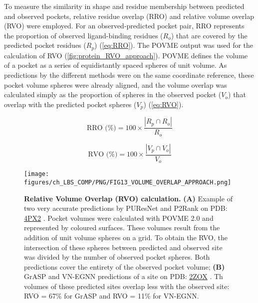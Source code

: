 To measure the similarity in shape and residue membership between predicted and observed pockets, relative residue overlap (RRO) and relative volume overlap (RVO) were employed. For an observed-predicted pocket pair, RRO represents the proportion of observed ligand-binding residues ($R_{o}$) that are covered by the predicted pocket residues ($R_{p}$) (\autoref{eq:RRO}). The POVME output was used for the calculation of RVO (\autoref{fig:protein_RVO_approach}). POVME defines the volume of a pocket as a series of equidistantly spaced spheres of unit volume. As predictions by the different methods were on the same coordinate reference, these pocket volume spheres were already aligned, and the volume overlap was calculated simply as the proportion of spheres in the observed pocket ($V_{o}$) that overlap with the predicted pocket spheres ($V_{p}$) (\autoref{eq:RVO}).

\begin{equation}
\text{RRO (\%)} = 100 \times \frac{|R_p \cap R_o|}{R_o}
\label{eq:RRO}
\end{equation}

\vspace{-12pt} %

\begin{equation}
\text{RVO (\%)} = 100 \times \frac{|V_p \cap V_o|}{V_o}
\label{eq:RVO}
\end{equation}

\begin{figure}[p]
    \centering
    \texttt{[image: figures/ch\_LBS\_COMP/PNG/FIG13\_VOLUME\_OVERLAP\_APPROACH.png]}
    \caption[Relative Volume Overlap (RVO) calculation]{\textbf{Relative Volume Overlap (RVO) calculation.} \textbf{(A)} Example of two very accurate predictions by PUResNet and P2Rank on PDB: \href{https://www.ebi.ac.uk/pdbe/entry/pdb/4px2}{4PX2} \cite{PDB_4PX2}. Pocket volumes were calculated with POVME 2.0 and represented by coloured surfaces. These volumes result from the addition of unit volume spheres on a grid. To obtain the RVO, the intersection of these spheres between predicted and observed site was divided by the number of observed pocket spheres. Both predictions cover the entirety of the observed pocket volume; \textbf{(B)} GrASP and VN-EGNN predictions of a site on PDB: \href{https://www.ebi.ac.uk/pdbe/entry/pdb/2ZOX}{2ZOX} \cite{NOGUCHI_2008_STRUCTURE}. Th volumes of these predicted sites overlap less with the observed site: RVO = 67\% for GrASP and RVO = 11\% for VN-EGNN.}
    \label{fig:protein_RVO_approach}
\end{figure}


